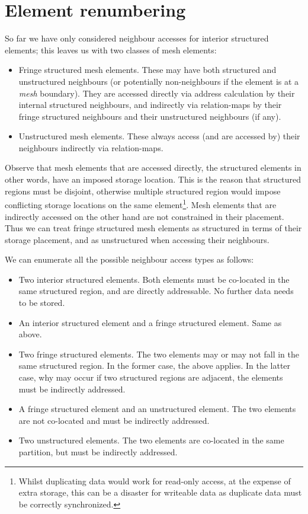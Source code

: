 
\section{Element renumbering}
So far we have only considered neighbour accesses for interior structured elements; this leaves us with two classes of mesh elements:
\begin{itemize}
\item Fringe structured mesh elements.
These may have both structured and unstructured neighbours (or potentially non-neighbours if the element is at a \emph{mesh} boundary). They are accessed directly via address calculation by their internal structured neighbours, and indirectly via relation-maps by their fringe structured neighbours and their unstructured neighbours (if any).

\item Unstructured mesh elements.
These always access (and are accessed by) their neighbours indirectly via relation-maps.
\end{itemize}

Observe that mesh elements that are accessed directly, the structured elements in other words, have an imposed storage location. This is the reason that structured regions must be disjoint, otherwise multiple structured region would impose conflicting storage locations on the same element\footnote{Whilst duplicating data would work for read-only access, at the expense of extra storage, this can be a disaster for writeable data as duplicate data must be correctly synchronized.}. Mesh elements that are indirectly accessed on the other hand are not constrained in their placement. Thus we can treat fringe structured mesh elements as structured in terms of their storage placement, and as unstructured when accessing their neighbours.


We can enumerate all the possible neighbour access types as follows:
\begin{itemize}
\item Two interior structured elements.
Both elements must be co-located in the same structured region, and are directly addressable. No further data needs to be stored.
\item An interior structured element and a fringe structured element.
Same as above.
\item Two fringe structured elements.
The two elements may or may not fall in the same structured region. In the former case, the above applies. In the latter case, why may occur if two structured regions are adjacent, the elements must be indirectly addressed.
\item A fringe structured element and an unstructured element.
The two elements are not co-located and must be indirectly addressed.
\item Two unstructured elements.
The two elements are co-located in the same partition, but must be indirectly addressed.
\end{itemize}

